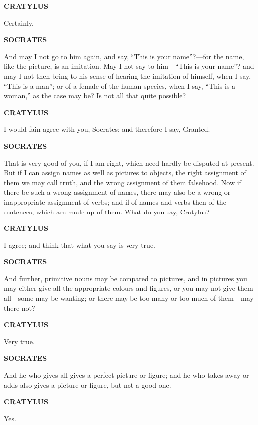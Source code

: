 \documentclass[11pt,letter]{article}
\begin{document}
\par \textbf{CRATYLUS}
\par   Certainly.

\par \textbf{SOCRATES}
\par   And may I not go to him again, and say, “This is your name”?—for the name, like the picture, is an imitation. May I not say to him—“This is your name”? and may I not then bring to his sense of hearing the imitation of himself, when I say, “This is a man”; or of a female of the human species, when I say, “This is a woman,” as the case may be? Is not all that quite possible?

\par \textbf{CRATYLUS}
\par   I would fain agree with you, Socrates; and therefore I say, Granted.

\par \textbf{SOCRATES}
\par   That is very good of you, if I am right, which need hardly be disputed at present. But if I can assign names as well as pictures to objects, the right assignment of them we may call truth, and the wrong assignment of them falsehood. Now if there be such a wrong assignment of names, there may also be a wrong or inappropriate assignment of verbs; and if of names and verbs then of the sentences, which are made up of them. What do you say, Cratylus?

\par \textbf{CRATYLUS}
\par   I agree; and think that what you say is very true.

\par \textbf{SOCRATES}
\par   And further, primitive nouns may be compared to pictures, and in pictures you may either give all the appropriate colours and figures, or you may not give them all—some may be wanting; or there may be too many or too much of them—may there not?

\par \textbf{CRATYLUS}
\par   Very true.

\par \textbf{SOCRATES}
\par   And he who gives all gives a perfect picture or figure; and he who takes away or adds also gives a picture or figure, but not a good one.

\par \textbf{CRATYLUS}
\par   Yes.
\end{document}
